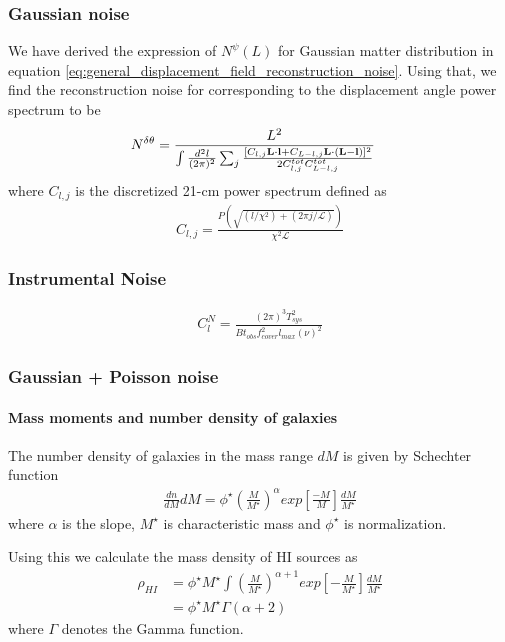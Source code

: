 \documentclass[12pt]{article}
\def\l{{\bf l}}
\def\L{{\bf L}}
\numberwithin{equation}{section}
\begin{document}
\subsubsection{Gaussian noise}
We have derived the expression of $ N^\psi(L) $ for Gaussian matter distribution in equation \eqref{eq:general_displacement_field_reconstruction_noise}. Using that, we find the reconstruction noise for corresponding to the displacement angle power spectrum to be
\begin{align}
N^{\delta\theta} &= \frac{L^2}{\int \frac{d^2 l}{(2\pi)^2} \sum_{j} \frac{[C_{l,j} \L\cdot \l +
		C_{L-l,j} \L\cdot (\L-\l)]^2}{2C^{tot}_{l,j}C^{tot}_{L-l,j}} }
\end{align}
where $ C_{l, j} $ is the discretized 21-cm power spectrum defined as 
\begin{align}
C_{l,j} = \frac{P(\sqrt{(l/\chi^2) + (2\pi j / \mathcal{L})})}{\chi^2\mathcal{L}}
\end{align}

\subsubsection{Instrumental Noise}
\begin{align}
C_l^N = \frac{(2\pi)^3 T_{sys}^2}{B t_{obs}f_{cover}^2 l_{max}(\nu)^2 }
\end{align}

\subsubsection{Gaussian + Poisson noise}

\paragraph{Mass moments and number density of galaxies}
The number density of galaxies in the mass range $ dM $ is given by Schechter function
\begin{align}
\frac{dn}{dM}dM = \phi^\star \left(\frac{M}{M^\star}\right)^\alpha exp \left[\frac{-M}{M}\right] \frac{dM}{M^\star}
\end{align}
where $\alpha$ is the slope, $ M^\star $ is characteristic mass and $\phi^\star$ is normalization.

Using this we calculate the mass density of HI sources as
\begin{align}
\rho_{HI}  &= \phi^{\star}M^\star \int \left(\frac{M}{M^\star}\right)^{\alpha + 1} exp\left[ -\frac{M}{M^\star} \right]\frac{dM}{M^\star}\\
&= \phi^\star M^\star \Gamma(\alpha + 2)
\end{align}
where $ \Gamma $ denotes the Gamma function.
\end{document}
